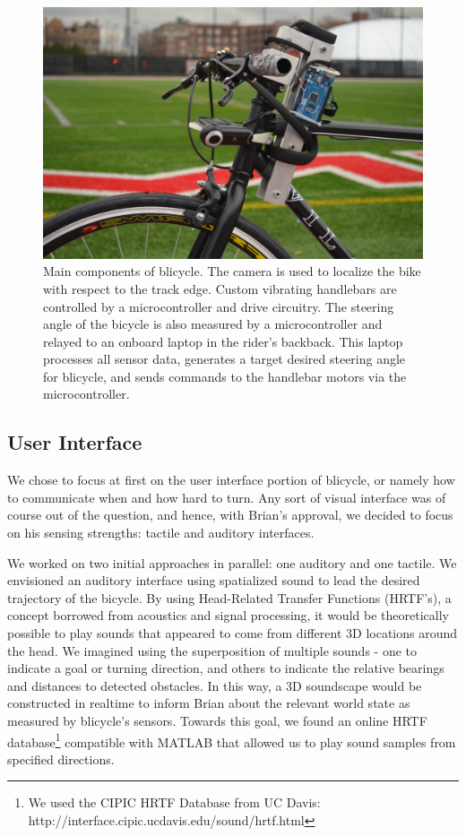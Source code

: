 \documentclass[aps,twocolumn,secnumarabic,balancelastpage,amsmath,amssymb,nofootinbib]{revtex4-1}
\begin{document}
\begin{figure}
\includegraphics[scale=0.18]{blicycle_overall.jpg}
\caption{Main components of blicycle. The camera is used to localize the bike with respect to the track edge. Custom vibrating handlebars are controlled by a microcontroller and drive circuitry. The steering angle of the bicycle is also measured by a microcontroller and relayed to an onboard laptop in the rider's backback. This laptop processes all sensor data, generates a target desired steering angle for blicycle, and sends commands to the handlebar motors via the microcontroller.}
\label{fig:BlicycleOverview}
\end{figure}

\subsection{User Interface}
We chose to focus at first on the user interface portion of blicycle, or namely how to communicate when and how hard to turn. Any sort of visual interface was of course out of the question, and hence, with Brian's approval, we decided to focus on his sensing strengths: tactile and auditory interfaces.

We worked on two initial approaches in parallel: one auditory and one tactile. We envisioned an auditory interface using spatialized sound to lead the desired trajectory of the bicycle. By using Head-Related Transfer Functions (HRTF's), a concept borrowed from acoustics and signal processing, it would be theoretically possible to play sounds that appeared to come from different 3D locations around the head. We imagined using the superposition of multiple sounds - one to indicate a goal or turning direction, and others to indicate the relative bearings and distances to detected obstacles. In this way, a 3D soundscape would be constructed in realtime to inform Brian about the relevant world state as measured by blicycle's sensors. Towards this goal, we found an online HRTF database\footnote{We used the CIPIC HRTF Database from UC Davis: http://interface.cipic.ucdavis.edu/sound/hrtf.html} compatible with MATLAB that allowed us to play sound samples from specified directions.
\end{document}

